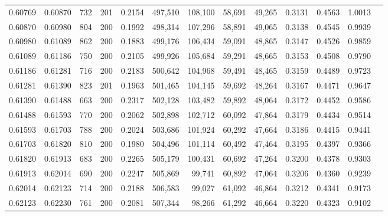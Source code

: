 \begin{tabular}{rrrrrrrrrrrrr}
0.60769 & 0.60870 &   732 & 201 &                                     0.2154 & 497,510 & 108,100 &  58,691 &  49,265 & 0.3131 & 0.4563 & 1.0013 \\
0.60870 & 0.60980 &   804 & 200 &                                     0.1992 & 498,314 & 107,296 &  58,891 &  49,065 & 0.3138 & 0.4545 & 0.9939 \\
0.60980 & 0.61089 &   862 & 200 &                                     0.1883 & 499,176 & 106,434 &  59,091 &  48,865 & 0.3147 & 0.4526 & 0.9859 \\
0.61089 & 0.61186 &   750 & 200 &                                     0.2105 & 499,926 & 105,684 &  59,291 &  48,665 & 0.3153 & 0.4508 & 0.9790 \\
0.61186 & 0.61281 &   716 & 200 &                                     0.2183 & 500,642 & 104,968 &  59,491 &  48,465 & 0.3159 & 0.4489 & 0.9723 \\
0.61281 & 0.61390 &   823 & 201 &                                     0.1963 & 501,465 & 104,145 &  59,692 &  48,264 & 0.3167 & 0.4471 & 0.9647 \\
0.61390 & 0.61488 &   663 & 200 &                                     0.2317 & 502,128 & 103,482 &  59,892 &  48,064 & 0.3172 & 0.4452 & 0.9586 \\
0.61488 & 0.61593 &   770 & 200 &                                     0.2062 & 502,898 & 102,712 &  60,092 &  47,864 & 0.3179 & 0.4434 & 0.9514 \\
0.61593 & 0.61703 &   788 & 200 &                                     0.2024 & 503,686 & 101,924 &  60,292 &  47,664 & 0.3186 & 0.4415 & 0.9441 \\
0.61703 & 0.61820 &   810 & 200 &                                     0.1980 & 504,496 & 101,114 &  60,492 &  47,464 & 0.3195 & 0.4397 & 0.9366 \\
0.61820 & 0.61913 &   683 & 200 &                                     0.2265 & 505,179 & 100,431 &  60,692 &  47,264 & 0.3200 & 0.4378 & 0.9303 \\
0.61913 & 0.62014 &   690 & 200 &                                     0.2247 & 505,869 &  99,741 &  60,892 &  47,064 & 0.3206 & 0.4360 & 0.9239 \\
0.62014 & 0.62123 &   714 & 200 &                                     0.2188 & 506,583 &  99,027 &  61,092 &  46,864 & 0.3212 & 0.4341 & 0.9173 \\
0.62123 & 0.62230 &   761 & 200 &                                     0.2081 & 507,344 &  98,266 &  61,292 &  46,664 & 0.3220 & 0.4323 & 0.9102 \\

\end{tabular}
